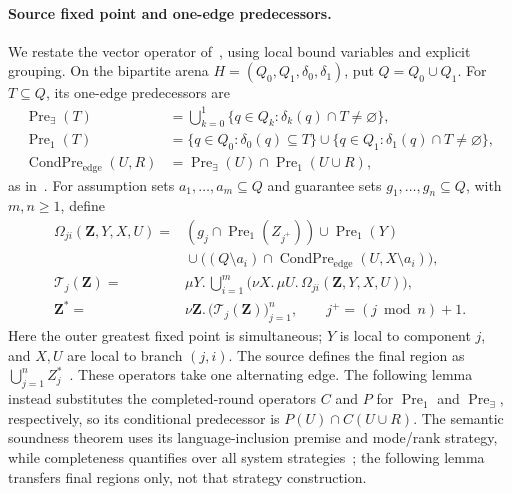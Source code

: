 \documentclass[11pt]{article}
\begin{document}
\paragraph{Source fixed point and one-edge predecessors.}
We restate the vector operator of~\cite[Eq.~(15)]{friendly}, using local
bound variables and explicit grouping.
On the bipartite arena $H=(Q_0,Q_1,\delta_0,\delta_1)$, put
$Q=Q_0\cup Q_1$. For $T\subseteq Q$, its one-edge predecessors are
\[
\begin{aligned}
\operatorname{Pre}_{\exists}(T)
 &=\bigcup_{k=0}^{1}\{q\in Q_k:\delta_k(q)\cap T\ne\varnothing\},\\
\operatorname{Pre}_1(T)
 &=\{q\in Q_0:\delta_0(q)\subseteq T\}
   \cup\{q\in Q_1:\delta_1(q)\cap T\ne\varnothing\},\\
\operatorname{CondPre}_{\mathrm{edge}}(U,R)
 &=\operatorname{Pre}_{\exists}(U)\cap\operatorname{Pre}_1(U\cup R),
\end{aligned}
\]
as in~\cite[Eqs.~(1), (4), and (5)]{friendly}.
For assumption sets $a_1,\ldots,a_m\subseteq Q$ and guarantee sets
$g_1,\ldots,g_n\subseteq Q$, with $m,n\geq1$, define
\[
\begin{aligned}
\Omega_{ji}(\mathbf Z,Y,X,U)
 ={}&(g_j\cap\operatorname{Pre}_1(Z_{j^+}))
       \cup\operatorname{Pre}_1(Y)\\
    &{}\cup\bigl((Q\setminus a_i)\cap
       \operatorname{CondPre}_{\mathrm{edge}}(U,X\setminus a_i)\bigr),\\
\mathcal T_j(\mathbf Z)
 ={}&\mu Y.\,\bigcup_{i=1}^{m}
       \bigl(\nu X.\,\mu U.\,\Omega_{ji}(\mathbf Z,Y,X,U)\bigr),\\
\mathbf Z^*
 ={}&\nu\mathbf Z.\,\bigl(\mathcal T_j(\mathbf Z)\bigr)_{j=1}^{n},
\qquad j^+=(j\bmod n)+1.
\end{aligned}
\]
Here the outer greatest fixed point is simultaneous; $Y$ is local to
component $j$, and $X,U$ are local to branch $(j,i)$. The source defines
the final region as $\bigcup_{j=1}^{n}Z_j^*$~\cite[Appendix~B.1]{friendly}.
These operators take one alternating edge. The following lemma instead
substitutes the completed-round operators $C$ and $P$ for
$\operatorname{Pre}_1$ and $\operatorname{Pre}_{\exists}$, respectively,
so its conditional predecessor is $P(U)\cap C(U\cup R)$.
The semantic soundness theorem uses its language-inclusion premise and
mode/rank strategy, while completeness quantifies over all system
strategies~\cite[Theorem~3 and Appendix~B.2]{friendly}; the following
lemma transfers final regions only, not that strategy construction.
\end{document}
